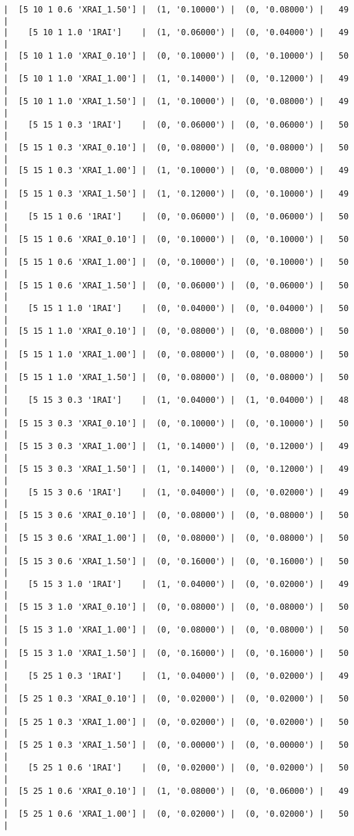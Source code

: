 \documentclass{article}
\begin{document}
\begin{verbatim}
|  [5 10 1 0.6 'XRAI_1.50'] |  (1, '0.10000') |  (0, '0.08000') |   49  |
|    [5 10 1 1.0 '1RAI']    |  (1, '0.06000') |  (0, '0.04000') |   49  |
|  [5 10 1 1.0 'XRAI_0.10'] |  (0, '0.10000') |  (0, '0.10000') |   50  |
|  [5 10 1 1.0 'XRAI_1.00'] |  (1, '0.14000') |  (0, '0.12000') |   49  |
|  [5 10 1 1.0 'XRAI_1.50'] |  (1, '0.10000') |  (0, '0.08000') |   49  |
|    [5 15 1 0.3 '1RAI']    |  (0, '0.06000') |  (0, '0.06000') |   50  |
|  [5 15 1 0.3 'XRAI_0.10'] |  (0, '0.08000') |  (0, '0.08000') |   50  |
|  [5 15 1 0.3 'XRAI_1.00'] |  (1, '0.10000') |  (0, '0.08000') |   49  |
|  [5 15 1 0.3 'XRAI_1.50'] |  (1, '0.12000') |  (0, '0.10000') |   49  |
|    [5 15 1 0.6 '1RAI']    |  (0, '0.06000') |  (0, '0.06000') |   50  |
|  [5 15 1 0.6 'XRAI_0.10'] |  (0, '0.10000') |  (0, '0.10000') |   50  |
|  [5 15 1 0.6 'XRAI_1.00'] |  (0, '0.10000') |  (0, '0.10000') |   50  |
|  [5 15 1 0.6 'XRAI_1.50'] |  (0, '0.06000') |  (0, '0.06000') |   50  |
|    [5 15 1 1.0 '1RAI']    |  (0, '0.04000') |  (0, '0.04000') |   50  |
|  [5 15 1 1.0 'XRAI_0.10'] |  (0, '0.08000') |  (0, '0.08000') |   50  |
|  [5 15 1 1.0 'XRAI_1.00'] |  (0, '0.08000') |  (0, '0.08000') |   50  |
|  [5 15 1 1.0 'XRAI_1.50'] |  (0, '0.08000') |  (0, '0.08000') |   50  |
|    [5 15 3 0.3 '1RAI']    |  (1, '0.04000') |  (1, '0.04000') |   48  |
|  [5 15 3 0.3 'XRAI_0.10'] |  (0, '0.10000') |  (0, '0.10000') |   50  |
|  [5 15 3 0.3 'XRAI_1.00'] |  (1, '0.14000') |  (0, '0.12000') |   49  |
|  [5 15 3 0.3 'XRAI_1.50'] |  (1, '0.14000') |  (0, '0.12000') |   49  |
|    [5 15 3 0.6 '1RAI']    |  (1, '0.04000') |  (0, '0.02000') |   49  |
|  [5 15 3 0.6 'XRAI_0.10'] |  (0, '0.08000') |  (0, '0.08000') |   50  |
|  [5 15 3 0.6 'XRAI_1.00'] |  (0, '0.08000') |  (0, '0.08000') |   50  |
|  [5 15 3 0.6 'XRAI_1.50'] |  (0, '0.16000') |  (0, '0.16000') |   50  |
|    [5 15 3 1.0 '1RAI']    |  (1, '0.04000') |  (0, '0.02000') |   49  |
|  [5 15 3 1.0 'XRAI_0.10'] |  (0, '0.08000') |  (0, '0.08000') |   50  |
|  [5 15 3 1.0 'XRAI_1.00'] |  (0, '0.08000') |  (0, '0.08000') |   50  |
|  [5 15 3 1.0 'XRAI_1.50'] |  (0, '0.16000') |  (0, '0.16000') |   50  |
|    [5 25 1 0.3 '1RAI']    |  (1, '0.04000') |  (0, '0.02000') |   49  |
|  [5 25 1 0.3 'XRAI_0.10'] |  (0, '0.02000') |  (0, '0.02000') |   50  |
|  [5 25 1 0.3 'XRAI_1.00'] |  (0, '0.02000') |  (0, '0.02000') |   50  |
|  [5 25 1 0.3 'XRAI_1.50'] |  (0, '0.00000') |  (0, '0.00000') |   50  |
|    [5 25 1 0.6 '1RAI']    |  (0, '0.02000') |  (0, '0.02000') |   50  |
|  [5 25 1 0.6 'XRAI_0.10'] |  (1, '0.08000') |  (0, '0.06000') |   49  |
|  [5 25 1 0.6 'XRAI_1.00'] |  (0, '0.02000') |  (0, '0.02000') |   50  |

\end{verbatim}
\end{document}
